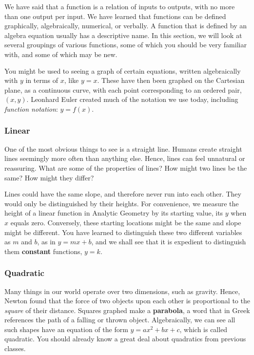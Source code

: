



We have said that a function is a relation of inputs to outputs, with no more than one output per input.  
We have learned that functions can be defined graphically, algebraically, numerical, or verbally.
A function that is defined by an algebra equation usually has a descriptive name.
In this section, we will look at several groupings of various functions, some of which you should
be very familiar with, and some of which may be new.


You might be used to seeing a  \gls{graph} of certain equations, written algebraically with $y$ in terms
of $x$, like $y=x$.  These have then been graphed on the Cartesian plane, as a continuous curve,
with each point corresponding to an ordered pair, $(x,y)$.  Leonhard Euler created much of the notation
we use today, including \emph{function notation}: $y=f(x)$.

\subsubsection{Linear}
One of the most obvious things to see is a straight line.  
Humans create straight lines seemingly more often
than anything else.  Hence, lines can feel unnatural or reassuring.  
What are some of the properties of lines?
How might two lines be the same?  How might they differ?  

Lines could have the same slope, and therefore never run into each other.  
They would only be distinguished by their
heights.  For convenience, we measure the height of a \gls{linear} function 
in Analytic Geometry by its starting value, its $y$ when $x$ 
equals zero.  Conversely, these starting locations might be the same and 
slope might be different.  You have learned 
to distinguish these two different variables as $m$ and $b$, as in $y=mx+b$, and we shall see
that it is expedient to distinguish them \textbf{constant} functions, $y=k$.

\subsubsection{Quadratic}
Many things in our world operate over two dimensions, such as gravity.  
Hence, Newton found that the force
of two objects upon each other is proportional to the \emph{square} of their distance.  
Squares graphed make a
\textbf{parabola}, a word that in Greek references the path of a falling or thrown object.  
Algebraically, we can see all such shapes
have an equation of the form $y=ax^2+bx+c$, which is called \gls{quadratic}.  
You should already know a great deal about quadratics from previous classes.

